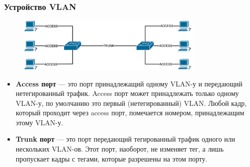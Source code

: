 \documentclass[aspectratio=169]{beamer}
\begin{document}
\begin{frame}
  \frametitle{Устройство VLAN}

  \begin{figure}[H]
    \centering
    \includegraphics[width=0.8\textwidth]{images/vlan-access-trunk.png}
  \end{figure}

  \footnotesize

  \begin{itemize}[label=,leftmargin=0pt]
    \item \textbf{Access порт} --- это порт принадлежащий одному VLAN-у и
    передающий нетегированный трафик. Access порт может принадлежать только одному
    VLAN-у, по умолчанию это первый (нетегированный) VLAN. Любой кадр, который
    проходит через access порт, помечается номером, принадлежащим этому VLAN-у.
    \item \textbf{Trunk порт} --- это порт передающий тегированный трафик одного или нескольких
    VLAN-ов. Этот порт, наоборот, не изменяет тег, а лишь пропускает кадры с тегами,
    которые разрешены на этом порту.
  \end{itemize}

\end{frame}
\end{document}
